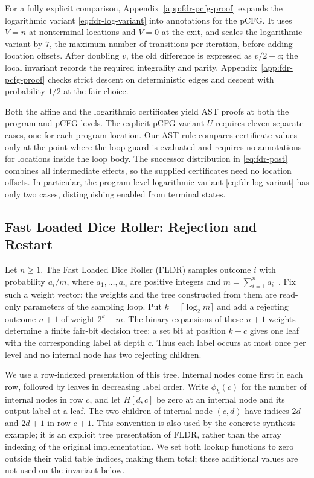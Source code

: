 For a fully explicit comparison, Appendix~\ref{app:fdr-pcfg-proof}
expands the logarithmic variant \eqref{eq:fdr-log-variant} into
annotations for the pCFG. It uses $V=n$ at nonterminal locations
and $V=0$ at the exit, and scales the logarithmic variant by $7$,
the maximum number of transitions per iteration, before adding
location offsets.
After doubling $v$, the old difference is expressed as $v/2-c$;
the local invariant records the required integrality and parity.
Appendix~\ref{app:fdr-pcfg-proof} checks strict descent on deterministic
edges and descent with probability $1/2$ at the fair choice.

Both the affine and the logarithmic certificates yield AST proofs
at both the program and pCFG levels.
The explicit pCFG variant $U$ requires eleven separate cases,
one for each program location.
Our AST rule compares certificate values only at the point where
the loop guard is evaluated and requires no annotations for
locations inside the loop body.
The successor distribution in \eqref{eq:fdr-post} combines all
intermediate effects, so the supplied certificates need no location
offsets. In particular, the program-level logarithmic variant
\eqref{eq:fdr-log-variant} has only two cases, distinguishing
enabled from terminal states.

\subsection{Fast Loaded Dice Roller: Rejection and Restart}
\label{sec:fldr}

Let $n\geq1$. The Fast Loaded Dice Roller (FLDR) samples outcome $i$
with probability $a_i/m$, where $a_1,\ldots,a_n$ are positive integers
and $m=\sum_{i=1}^n a_i$~\cite{DBLP:conf/aistats/SaadFRM20}.
Fix such a weight vector; the weights and the tree constructed from them
are read-only parameters of the sampling loop. Put
$k=\lceil\log_2m\rceil$ and add a rejecting outcome $n+1$ of weight
$2^k-m$. The binary expansions of these $n+1$ weights determine a finite
fair-bit decision tree: a set bit at position $k-c$ gives one leaf with
the corresponding label at depth $c$. Thus each label occurs at most
once per level and no internal node has two rejecting children.

We use a row-indexed presentation of this tree. Internal nodes come first
in each row, followed by leaves in decreasing label order. Write
$\phi_h(c)$ for the number of internal nodes in row $c$, and let
$H[d,c]$ be zero at an internal node and its output label at a leaf.
The two children of internal node $(c,d)$ have indices $2d$ and $2d+1$
in row $c+1$. This convention is also used by the concrete synthesis
example; it is an explicit tree presentation of FLDR, rather than the
array indexing of the original implementation. We set both lookup
functions to zero outside their valid table indices, making them total;
these additional values are not used on the invariant below.

